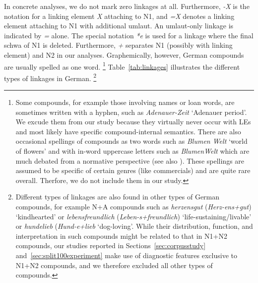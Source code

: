 In concrete analyses, we do not mark zero linkages at all.
Furthermore, \textit{-X} is the notation for a linking element \textit{X} attaching to N1, and \textit{=X} denotes a linking element attaching to N1 with additional umlaut.
An umlaut-only linkage is indicated by \textit{=} alone.
The special notation \textit{*e} is used for a linkage where the final schwa of N1 is deleted.
Furthermore, \textit{+} separates N1 (possibly with linking element) and N2 in our analyses.
Graphemically, however, German compounds are usually spelled as one word.%
\footnote{Some compounds, for example those involving names or loan words, are sometimes written with a hyphen, such as \textit{Adenauer-Zeit} `Adenauer period'.
We excude them from our study because they virtually never occur with LEs and most likely have specific compound-internal semantics.
There are also occasional spellings of compounds as two words such as \textit{Blumen Welt} `world of flowers' and with in-word uppercase letters such as \textit{BlumenWelt} which are much debated from a normative perspective (see also \citealt{Scherer2012}).
These spellings are assumed to be specific of certain genres (like commercials) and are quite rare overall.
Therfore, we do not include them in our study.}
Table~\ref{tab:linkages} illustrates the different types of linkages in German.%
\footnote{Different types of linkages are also found in other types of German compounds, for example N+A compounds such as \textit{herzensgut} (\textit{Herz-ens+gut}) `kindhearted' or \textit{lebensfreundlich} (\textit{Leben-s+freundlich}) `life-sustaining\slash livable' or \textit{hundelieb} (\textit{Hund-e+lieb} `dog-loving'.
While their distribution, function, and interpretation in such compounds might be related to that in N1+N2 compounds, our studies reported in Sections~\ref{sec:corpusstudy} and~\ref{sec:split100experiment} make use of diagnostic features exclusive to N1+N2 compounds, and we therefore excluded all other types of compounds.}

